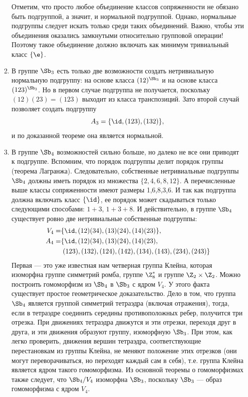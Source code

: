 \begin{enumerate}
Отметим, что просто любое объединение классов сопряженности не обязано быть подгруппой, а значит, и нормальной подгруппой. Однако, нормальные подгруппы следует искать только среди таких объединений. Важно, чтобы эти объединения оказались замкнутыми относительно групповой операции! Поэтому такое объединение должно включать как минимум тривиальный класс $\{\e\}$.




\item В группе $\Sb_3$ есть только две возможности создать нетривиальную нормальную подгруппу: на основе класса $(12)^{\Sb_3}$ и на основе класса $(123)^{\Sb_3}$. Но в первом случае подгруппа не получается, поскольку $(12)(23)=(123)$ выходит из класса транспозиций. Зато второй случай позволяет создать подгруппу
$$
A_3 = \{\id,(123),(132)\},
$$
и по доказанной теореме она является нормальной.

\item В группе $\Sb_4$ возможностей сильно больше, но далеко не все они приводят к подгруппе. Вспомним, что порядок подгруппы делит порядок группы (теорема Лагранжа). Следовательно, собственные нетривиальные подгруппы $\Sb_4$ должны иметь порядок из множества $\{2,4,6,8,12\}$. А перечисленные выше классы сопряженности имеют размеры 1,6,8,3,6. И так как подгруппа должна включать класс $\{\id\}$, ее порядок может скадываться только следующими способами: $1+3$, $1+3+8$. И действительно, в группе $\Sb_4$ существует ровно две нетривиальные собственные подгруппы:
\begin{align*}
V_4 = & \{\id,(12)(34),(13)(24),(14)(23)\},\\
A_4 = & \{\id,(12)(34),(13)(24),(14)(23), \\
      & \;(123),(132),(124),(142),(134),(143),(234),(243)\}
\end{align*}
Первая --- это уже известная нам четверная группа Клейна, которая изоморфна группе симметрий ромба, группе $\Z_8^*$ и группе $\Z_2\times\Z_2$. Можно построить гомоморфизм из $\Sb_4$ в $\Sb_3$ с ядром $V_4$. У этого факта существует простое геометрическое доказательство. Дело в том, что группа $\Sb_4$ является группой симметрий тетраэдра (включая отражения), тогда, если в тетраэдре соединить середины противоположных ребер, получится три отрезка. При движениях тетраэдра движутся и эти отрезки, переходя друг в друга, и эти движения образуют группу, изоморфную $\Sb_3$. При этом, как легко проверить, движения вершин тетраэдра, соответствующие перестановкам из группы Клейна, не меняют положение этих отрезков (они могут переворачиваться, но переходят каждый сам в себя), т.е. группа Клейна является ядром такого гомоморфизма. Из основной теоремы о гомоморфизмах также следует, что $\Sb_4/V_4$ изоморфна $\Sb_3$, поскольку $\Sb_3$ --- образ гомоморфизма с ядром $V_4$.


\end{enumerate}
